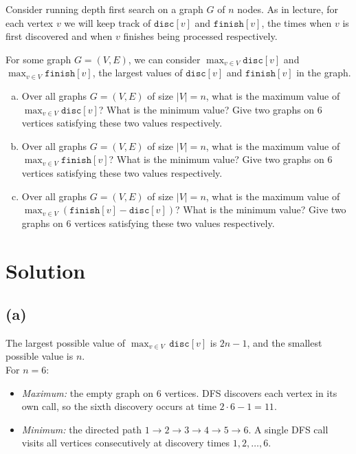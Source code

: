 \documentclass[11pt]{article}
\begin{document}

    \begin{tcolorbox}[title={Problem 1 (DFS Olympics, 30 pts)}] \setlength\parindent{1em}
        Consider running depth first search on a graph $G$ of $n$ nodes. As in lecture, for each vertex $v$ we will keep track of $\texttt{disc}[v]$ and $\texttt{finish}[v]$, the times when $v$ is first discovered and when $v$ finishes being processed respectively.

        For some graph $G=(V,E)$, we can consider $\max_{v \in V} \texttt{disc}[v]$ and $\max_{v \in V} \texttt{finish}[v]$, the largest values of $\texttt{disc}[v]$ and $\texttt{finish}[v]$ in the graph.

        \begin{enumerate}[(a)]
            \item Over all graphs $G=(V,E)$ of size $|V|=n$, what is the maximum value of $\max_{v \in V} \texttt{disc}[v]$? What is the minimum value? Give two graphs on $6$ vertices satisfying these two values respectively.
            
            \item Over all graphs $G=(V,E)$ of size $|V|=n$, what is the maximum value of $\max_{v \in V} \texttt{finish}[v]$? What is the minimum value? Give two graphs on $6$ vertices satisfying these two values respectively.
            
            \item Over all graphs $G=(V,E)$ of size $|V|=n$, what is the maximum value of $\max_{v \in V} (\texttt{finish}[v] - \texttt{disc}[v])$? What is the minimum value? Give two graphs on $6$ vertices satisfying these two values respectively.
        \end{enumerate}   
    \end{tcolorbox}
    
    \section*{Solution}

    \subsection*{(a)}
    The largest possible value of $\max_{v\in V}\,\texttt{disc}[v]$ is $2n-1$, and the smallest possible value is $n$.\\ 
    For $n=6$:
    \begin{itemize}
      \item \emph{Maximum:} the empty graph on 6 vertices.  DFS discovers each vertex in its own call, so the sixth discovery occurs at time $2\cdot6-1=11$.
      \item \emph{Minimum:} the directed path $1\to2\to3\to4\to5\to6$.  A single DFS call visits all vertices consecutively at discovery times $1,2,\dots,6$.
    \end{itemize}
    
\end{document}
